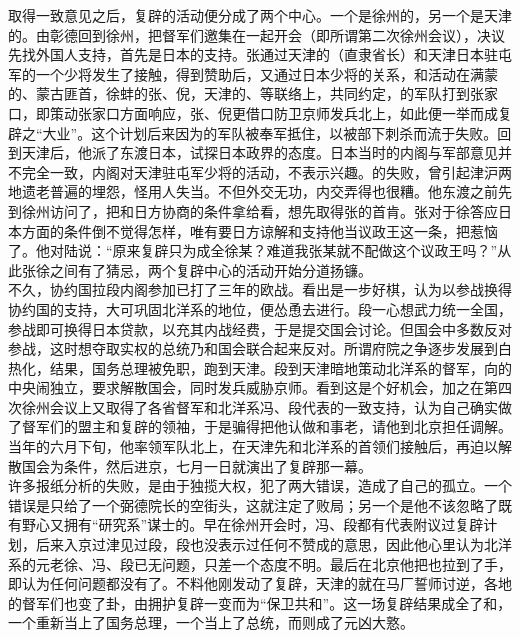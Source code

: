 取得一致意见之后，复辟的活动便分成了两个中心。一个是徐州的，另一个是天津的。由彰德回到徐州，把督军们邀集在一起开会（即所谓第二次徐州会议），决议先找外国人支持，首先是日本的支持。张通过天津的（直隶省长）和天津日本驻屯军的一个少将发生了接触，得到赞助后，又通过日本少将的关系，和活动在满蒙的、蒙古匪首，徐蚌的张、倪，天津的、等联络上，共同约定，的军队打到张家口，即策动张家口方面响应，张、倪更借口防卫京师发兵北上，如此便一举而成复辟之“大业”。这个计划后来因为的军队被奉军抵住，以被部下刺杀而流于失败。回到天津后，他派了东渡日本，试探日本政界的态度。日本当时的内阁与军部意见并不完全一致，内阁对天津驻屯军少将的活动，不表示兴趣。的失败，曾引起津沪两地遗老普遍的埋怨，怪用人失当。不但外交无功，内交弄得也很糟。他东渡之前先到徐州访问了，把和日方协商的条件拿给看，想先取得张的首肯。张对于徐答应日本方面的条件倒不觉得怎样，唯有要日方谅解和支持他当议政王这一条，把惹恼了。他对陆说：“原来复辟只为成全徐某？难道我张某就不配做这个议政王吗？”从此张徐之间有了猜忌，两个复辟中心的活动开始分道扬镰。\\

不久，协约国拉段内阁参加已打了三年的欧战。看出是一步好棋，认为以参战换得协约国的支持，大可巩固北洋系的地位，便怂恿去进行。段一心想武力统一全国，参战即可换得日本贷款，以充其内战经费，于是提交国会讨论。但国会中多数反对参战，这时想夺取实权的总统乃和国会联合起来反对。所谓府院之争逐步发展到白热化，结果，国务总理被免职，跑到天津。段到天津暗地策动北洋系的督军，向的中央闹独立，要求解散国会，同时发兵威胁京师。看到这是个好机会，加之在第四次徐州会议上又取得了各省督军和北洋系冯、段代表的一致支持，认为自己确实做了督军们的盟主和复辟的领袖，于是骗得把他认做和事老，请他到北京担任调解。当年的六月下旬，他率领军队北上，在天津先和北洋系的首领们接触后，再迫以解散国会为条件，然后进京，七月一日就演出了复辟那一幕。\\

许多报纸分析的失败，是由于独揽大权，犯了两大错误，造成了自己的孤立。一个错误是只给了一个弼德院长的空街头，这就注定了败局；另一个是他不该忽略了既有野心又拥有“研究系”谋士的。早在徐州开会时，冯、段都有代表附议过复辟计划，后来入京过津见过段，段也没表示过任何不赞成的意思，因此他心里认为北洋系的元老徐、冯、段已无问题，只差一个态度不明。最后在北京他把也拉到了手，即认为任何问题都没有了。不料他刚发动了复辟，天津的就在马厂誓师讨逆，各地的督军们也变了卦，由拥护复辟一变而为“保卫共和”。这一场复辟结果成全了和，一个重新当上了国务总理，一个当上了总统，而则成了元凶大憝。\\

